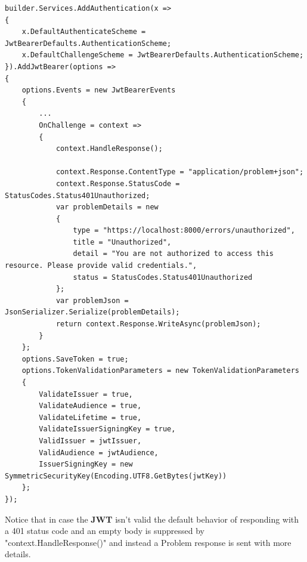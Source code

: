 \begin{lstlisting}[style=sharpc]
builder.Services.AddAuthentication(x =>
{
	x.DefaultAuthenticateScheme = JwtBearerDefaults.AuthenticationScheme;
	x.DefaultChallengeScheme = JwtBearerDefaults.AuthenticationScheme;
}).AddJwtBearer(options =>
{
	options.Events = new JwtBearerEvents
	{
		...
		OnChallenge = context =>
		{
			context.HandleResponse();
			
			context.Response.ContentType = "application/problem+json";
			context.Response.StatusCode = StatusCodes.Status401Unauthorized;
			var problemDetails = new
			{
				type = "https://localhost:8000/errors/unauthorized",
				title = "Unauthorized",
				detail = "You are not authorized to access this resource. Please provide valid credentials.",
				status = StatusCodes.Status401Unauthorized
			};
			var problemJson = JsonSerializer.Serialize(problemDetails);
			return context.Response.WriteAsync(problemJson);
		}
	};
	options.SaveToken = true;
	options.TokenValidationParameters = new TokenValidationParameters
	{
		ValidateIssuer = true,
		ValidateAudience = true,
		ValidateLifetime = true,
		ValidateIssuerSigningKey = true,
		ValidIssuer = jwtIssuer,
		ValidAudience = jwtAudience,
		IssuerSigningKey = new SymmetricSecurityKey(Encoding.UTF8.GetBytes(jwtKey))
	};
});
\end{lstlisting}

Notice that in case the \textbf{JWT} isn't valid the default behavior of responding with a 401 status code and an empty body is suppressed by "context.HandleResponse()" and instead a Problem response is sent with more details.


%
%
\newpage
